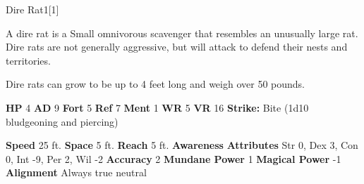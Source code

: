   
  \begin{monsection}{Dire Rat}{1}[1]
    \vspace{-1em}\vspace{-1em}
    \vspace{0em}

    
        A dire rat is a Small omnivorous scavenger that resembles an unusually large rat.
        Dire rats are not generally aggressive, but will attack to defend their nests and territories.
      
        Dire rats can grow to be up to 4 feet long and weigh over 50 pounds.
      

    \begin{spellcontent}
      \begin{spelltargetinginfo}
        \pari \textbf{HP} 4 \monsep
          \textbf{AD} 9 \monsep
          \textbf{Fort} 5 \monsep
          \textbf{Ref} 7 \monsep
          \textbf{Ment} 1
        \pari \textbf{WR} 5 \monsep
        \textbf{VR} 16
        \pari \textbf{Strike:}
            Bite  (1d10 bludgeoning and piercing)
      \end{spelltargetinginfo}
    \end{spellcontent}
    \begin{monsterfooter}
      \pari \textbf{Speed} 25 ft. \monsep
        \textbf{Space} 5 ft. \monsep
        \textbf{Reach} 5 ft.
      \pari \textbf{Awareness} 
      \pari \textbf{Attributes}
        Str 0, Dex 3,
        Con 0, Int -9,
        Per 2, Wil -2
      \pari \textbf{Accuracy} 2 \monsep
        \textbf{Mundane Power} 1 \monsep
      \textbf{Magical Power} -1
      \pari \textbf{Alignment} Always true neutral
    \end{monsterfooter}
  \end{monsection}
  
